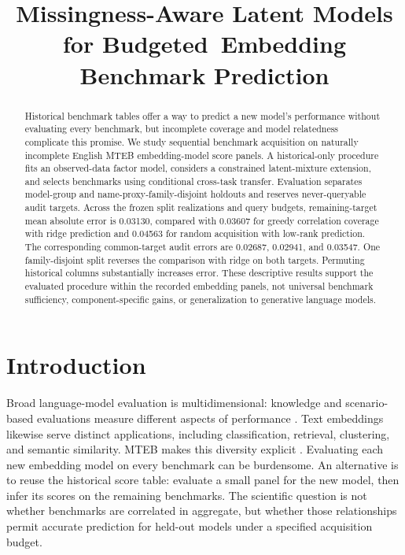 \documentclass{article}
\title{Missingness-Aware Latent Models for Budgeted\ Embedding Benchmark Prediction}
\author{}
\begin{document}
\maketitle

\begin{abstract}
Historical benchmark tables offer a way to predict a new model's performance without evaluating every benchmark, but incomplete coverage and model relatedness complicate this promise. We study sequential benchmark acquisition on naturally incomplete English MTEB embedding-model score panels. A historical-only procedure fits an observed-data factor model, considers a constrained latent-mixture extension, and selects benchmarks using conditional cross-task transfer. Evaluation separates model-group and name-proxy-family-disjoint holdouts and reserves never-queryable audit targets. Across the frozen split realizations and query budgets, remaining-target mean absolute error is 0.03130, compared with 0.03607 for greedy correlation coverage with ridge prediction and 0.04563 for random acquisition with low-rank prediction. The corresponding common-target audit errors are 0.02687, 0.02941, and 0.03547. One family-disjoint split reverses the comparison with ridge on both targets. Permuting historical columns substantially increases error. These descriptive results support the evaluated procedure within the recorded embedding panels, not universal benchmark sufficiency, component-specific gains, or generalization to generative language models.
\end{abstract}

\section{Introduction}
Broad language-model evaluation is multidimensional: knowledge and scenario-based evaluations measure different aspects of performance \citep{Hendrycks2021MMLU,Liang2023HELM}. Text embeddings likewise serve distinct applications, including classification, retrieval, clustering, and semantic similarity. MTEB makes this diversity explicit \citep{Muennighoff2023MTEB}. Evaluating each new embedding model on every benchmark can be burdensome. An alternative is to reuse the historical score table: evaluate a small panel for the new model, then infer its scores on the remaining benchmarks. The scientific question is not whether benchmarks are correlated in aggregate, but whether those relationships permit accurate prediction for held-out models under a specified acquisition budget.
\end{document}
